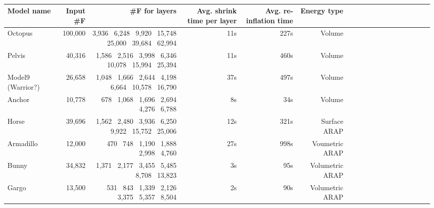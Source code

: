\begin{table*}
\centering
{}
\setlength{\tabcolsep}{5.5pt}
\begin{tabular}{l r r r r r r r r r r r r r r r r r}
\rowcolor{white}
Model name  & Input \#F & \#F for layers & Avg. shrink time per layer & Avg.
re-inflation time & Energy type\\
\midrule
Octopus & 100,000 & 3,936 \ 6,248 \ 9,920 \ 15,748 \ 25,000 \ 39,684 \ 62,994 & 11s & 227s & Volume \\
Pelvis & 40,316 & 1,586 \ 2,516 \ 3,998 \ 6,346 \ 10,078 \ 15,994 \ 25,394 & 11s & 460s & Volume  \\
Model9 (Warrior?) & 26,658 & 1,048 \ 1,666 \ 2,644 \ 4,198 \ 6,664 \ 10,578 \ 16,790 & 37s & 497s & Volume  \\
Anchor & 10,778 & 678 \ 1,068 \ 1,696 \ 2,694 \ 4,276 \ 6,788 & 8s & 34s & Volume \\
Horse & 39,696 & 1,562 \ 2,480 \ 3,936 \ 6,250 \ 9,922 \ 15,752 \ 25,006 & 12s & 321s & Surface ARAP \\
Armadillo & 12,000 & 470 \ 748 \ 1,190 \ 1,888 \ 2,998 \ 4,760 & 27s & 998s & Voumetric ARAP \\
Bunny & 34,832 & 1,371 \ 2,177 \ 3,455 \ 5,485 \ 8,708 \ 13,823 & 3s & 95s & Volumetric ARAP \\
Gargo & 13,500 & 531 \ 843 \ 1,339 \ 2,126 \ 3,375 \ 5,357 \ 8,504 & 2s & 90s & Volumetric ARAP
\bottomrule
\end{tabular}
\caption{}
\label{tab:timings}
\end{table*}
